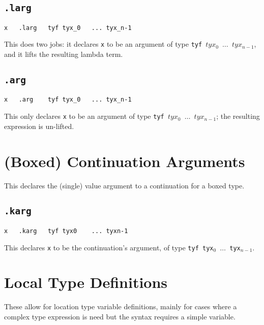 \documentclass{report}
\newcommand\stringcode[1]{\texttt{#1}}
\begin{document}
\subsection{\stringcode{.larg}}

\begin{verbatim}
x	.larg	tyf	tyx_0	...	tyx_n-1
\end{verbatim}

This does two jobs:
it declares \stringcode{x} to be an argument of type \stringcode{tyf $tyx_0$ $\ldots$ $tyx_{n-1}$},
and it lifts the resulting lambda term.

\subsection{\stringcode{.arg}}

\begin{verbatim}
x	.arg	tyf	tyx_0	...	tyx_n-1
\end{verbatim}

This only declares \stringcode{x} to be an argument of type \stringcode{tyf $tyx_0$ $\ldots$ $tyx_{n-1}$};
the resulting expression is un-lifted.

\section{(Boxed) Continuation Arguments}
\label{cont_arg}

This declares the (single) value argument to a continuation for a boxed type.

\subsection{\stringcode{.karg}}

\begin{verbatim}
x	.karg	tyf	tyx0	...	tyxn-1
\end{verbatim}

This declares \stringcode{x} to be the continuation's argument, of type \stringcode{tyf tyx$_0$ $\ldots$ tyx$_{n-1}$}.

\section{Local Type Definitions}
\label{code_type_let}

These allow for location type variable definitions,
mainly for cases where a complex type expression is need but the syntax requires a simple variable.
\end{document}
